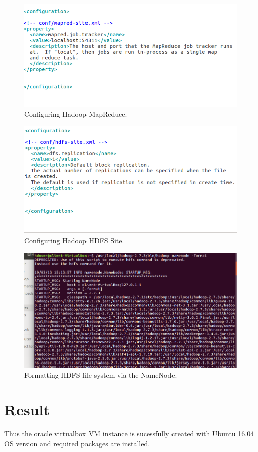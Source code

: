 \documentclass[a4paper,10pt]{article}
\begin{document}
	\begin{figure}[h]
		\includegraphics[scale=0.30,center]{exptTwoScreenShot/fig8.png}
		\caption{Configuring Hadoop MapReduce.}
		\label{fig:8}
	\end{figure}
	
	\begin{figure}[h]
		\includegraphics[scale=0.30,center]{exptTwoScreenShot/fig9.png}
		\caption{Configuring Hadoop HDFS Site.}
		\label{fig:9}
	\end{figure}

\pagebreak

	\begin{figure}[h]
		\includegraphics[scale=0.30,center]{exptTwoScreenShot/fig10.png}
		\caption{Formatting HDFS file system via the NameNode.}
		\label{fig:8}
	\end{figure}


\section{Result}
Thus the oracle virtualbox VM instance is sucessfully created with Ubuntu 16.04 OS version and required packages are installed.
\end{document}
